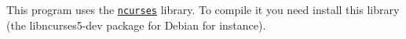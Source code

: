 This program uses the \href{https://www.gnu.org/software/ncurses/}{\tt ncurses} library. To compile it you need install this library (the libncurses5-\/dev package for Debian for instance). 